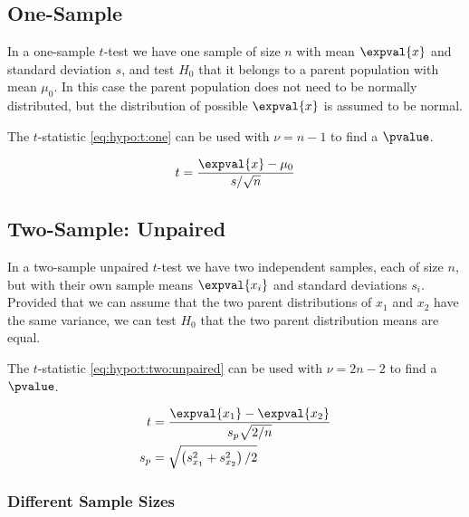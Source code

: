 \subsection{One-Sample}
\label{hypo:t_test:one}

In a one-sample $t$-test we have one sample of size $n$ with mean $\expval{x}$ and standard deviation $s$,
and test $H_{0}$ that it belongs to a parent population with mean $\mu_{0}$.
In this case the parent population does not need to be normally distributed, but the distribution of possible $\expval{x}$ is assumed to be normal.

The $t$-statistic \cref{eq:hypo:t:one} can be used with $\nu = n-1$ to find a $\pvalue$.

\begin{equation}\label{eq:hypo:t:one}
t = \frac{\expval{x} - \mu_{0}}{s / \sqrt{n}}
\end{equation}

\subsection{Two-Sample: Unpaired}
\label{hypo:t_test:two:unpaired}

In a two-sample unpaired $t$-test we have two independent samples, each of size $n$,
but with their own sample means $\expval{x_{i}}$ and standard deviations $s_{i}$.
Provided that we can assume that the two parent distributions of $x_{1}$ and $x_{2}$ have the same variance,
we can test $H_{0}$ that the two parent distribution means are equal.

The $t$-statistic \cref{eq:hypo:t:two:unpaired} can be used with $\nu = 2n-2$ to find a $\pvalue$.

\begin{subequations}\label{eq:hypo:t:two:unpaired}
\begin{align}
t &= \frac{\expval{x_{1}} - \expval{x_{2}}}{s_{p} \sqrt{2/n}} \label{eq:hypo:t:two:unpaired:t} \\
s_{p} &= \sqrt{\left(s^{2}_{x_{1}} + s^{2}_{x_{2}}\right)/2} \label{eq:hypo:t:two:unpaired:s_p}
\end{align}
\end{subequations}

\subsubsection{Different Sample Sizes}
\label{hypo:t_test:two:unpaired:diff_n}

